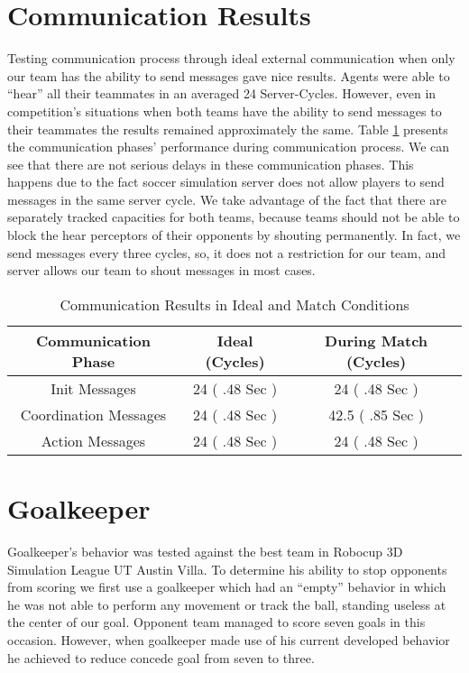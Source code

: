 \section{Communication Results}
Testing communication process through ideal external communication when only our team has the ability to send messages gave nice results. Agents were able to ``hear'' all their teammates in an averaged 24 Server-Cycles. However, even in competition's situations when both teams have the ability to send messages to their teammates the results remained approximately the same. Table \ref{CommunicationResults} presents the communication phases' performance during communication process. We can see that there are not serious delays in these communication phases. This happens due to the fact soccer simulation server does not allow players to send messages in the same server cycle. We take advantage of the fact that there are separately tracked capacities for both teams, because teams should not be able to block the hear perceptors of their opponents by shouting permanently. In fact, we send  messages every three cycles, so, it does not a restriction for our team, and server allows our team to shout messages in most cases.

\begin{table}
\begin{center}
    \begin{tabular}{ | c | c | c |}
    \hline
    \textbf{Communication Phase} 	& Ideal (Cycles) 			& During Match (Cycles) \\ \hline
    Init Messages 					& 24  ( .48 Sec ) 			& 24 	( .48 Sec )		 \\ \hline	
    Coordination Messages			& 24  ( .48 Sec )			& 42.5  ( .85 Sec )			 \\ \hline
    Action Messages 				    & 24  ( .48 Sec )			& 24 ( .48 Sec )	 		 \\ 
    \hline
    \end{tabular}
\end{center}
\label{CommunicationResults}
\caption{Communication Results in Ideal and Match Conditions}
\end{table}



\section{Goalkeeper}
Goalkeeper's behavior was tested against the best team in Robocup 3D Simulation League UT Austin Villa. To determine his ability to stop opponents from scoring we first use a goalkeeper which had an ``empty'' behavior in which he was not able to perform any movement or track the ball, standing useless at the center of our goal. Opponent team managed to score seven goals in this occasion. However, when goalkeeper made use of his current developed behavior he achieved to reduce concede goal from seven to three. 







